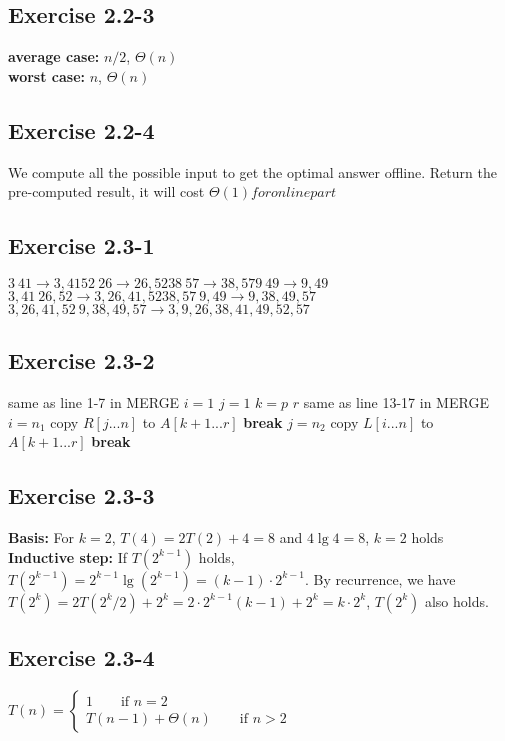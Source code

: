 \documentclass[12pt]{article}
\theoremstyle{definition}
\theoremstyle{remark}
\begin{document}
\subsection*{Exercise 2.2-3}
\textbf{average case:} $n/2$, $\Theta(n)$\\
\textbf{worst case:} $n$, $\Theta(n)$
\subsection*{Exercise 2.2-4}
We compute all the possible input to get the optimal answer offline. Return the pre-computed result, it will cost $\Theta(1) for online part$
\subsection*{Exercise 2.3-1}
$3\ 41\to 3,41$\qquad $52\ 26\to 26,52$\qquad $38\ 57\to 38,57$\qquad $9\ 49\to 9,49$\\
$3,41\ 26,52\to 3,26,41,52$\qquad $38,57\ 9,49\to 9,38,49,57$\\
$3,26,41,52\ 9,38,49,57\to 3,9,26,38,41,49,52,57$
\subsection*{Exercise 2.3-2}
\begin{codebox}
\li same as line 1-7 in MERGE
\li $i=1$
\li $j=1$
\li \For $k = p$ \To $r$ \label{li:for}
\li \quad same as line 13-17 in MERGE
\li \quad \If $i=n_1$ \label{li:if}
\li \qquad copy $R[j...n]$ to $A[k+1...r]$
\li \qquad \textbf{break}
\li \quad \If $j=n_2$ \label{li:if}
\li \qquad copy $L[i...n]$ to $A[k+1...r]$
\li \qquad \textbf{break}
\end{codebox}
\subsection*{Exercise 2.3-3}
\textbf{Basis:} For $k=2$, $T(4)=2T(2)+4=8$ and $4\lg4=8$, $k=2$ holds\\
\textbf{Inductive step:} If $T(2^{k-1})$ holds, $T(2^{k-1})=2^{k-1}\lg(2^{k-1})=(k-1)\cdot 2^{k-1}$. By recurrence, we have $T(2^k)=2T(2^k/2)+2^k=2\cdot 2^{k-1}(k-1)+2^k=k\cdot 2^k$, $T(2^k)$ also holds.
\subsection*{Exercise 2.3-4}
\(
T(n)=\left\{
\begin{array}{rr}
1\qquad \mbox{if $n=2$}\\
T(n-1)+\Theta(n) \qquad \mbox{if $n>2$}
\end{array}\right.
\)
\end{document}
